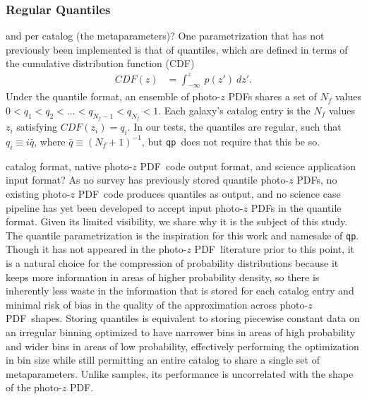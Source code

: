 \documentclass[\docopts]{\docclass}
\newcommand{\qp}{\texttt{qp}}
\newcommand{\pz}{photo-$z$ PDF}
\begin{document}
\subsubsection{Regular Quantiles}
\label{sec:quantiles}

and per catalog (the metaparameters)?
One parametrization that has not previously been implemented is that of 
quantiles, which are defined in terms of the cumulative distribution function 
(CDF)
\begin{align}
  \label{eq:cdf}
  CDF(z) &= \int_{-\infty}^{z}\ p(z')\ dz'.
\end{align}
Under the quantile format, an ensemble of \pz s shares a set of $N_{f}$ values 
$0<q_{1}<q_{2}<\dots<q_{N_{f}-1}<q_{N_{f}}<1$.  Each galaxy's catalog entry is 
the $N_{f}$ values $z_{i}$ satisfying $CDF(z_{i})=q_{i}$.  In our tests, the 
quantiles are regular, such that $q_{i}\equiv i\bar{q}$, where 
$\bar{q}\equiv(N_{f}+1)^{-1}$, but \qp\ does not require that this be so.

catalog format, native \pz\ code output format, and science application input 
format?
As no survey has previously stored quantile \pz s, no existing \pz\ code 
produces quantiles as output, and no science case pipeline has yet been 
developed to accept input \pz s in the quantile format.  Given its limited 
visibility, we share why it is the subject of this study.  The quantile 
parametrization is the inspiration for this work and namesake of \qp.  Though 
it has not appeared in the \pz\ literature prior to this point, it is a natural 
choice for the compression of probability distributions because it keeps more 
information in areas of higher probability density, so there is inherently less 
waste in the information that is stored for each catalog entry and minimal risk 
of bias in the quality of the approximation across \pz\ shapes.  Storing 
quantiles is equivalent to storing piecewise constant data on an irregular 
binning optimized to have narrower bins in areas of high probability and wider 
bins in areas of low probability, effectively performing the optimization in 
bin size while still permitting an entire catalog to share a single set of 
metaparameters.  Unlike samples, its performance is uncorrelated with the shape 
of the \pz.
\end{document}
